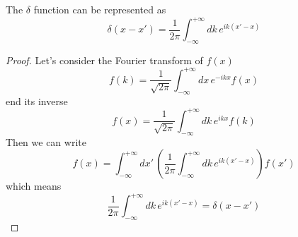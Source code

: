 \documentclass[11pt,fleqn]{book} %
\begin{document}
\begin{theorem}
    The $\delta$ function can be represented as
    \begin{equation*}
        \delta(x-x') = \frac{1}{2\pi}\int_ {-\infty}^{+\infty}\!dk\,e^{ik(x'-x)}
    \end{equation*}
\end{theorem}
\begin{proof}
    Let's consider the Fourier transform of $f(x)$
    \begin{equation*}
        f(k) = \frac{1}{\sqrt{2\pi}}\int_ {-\infty}^{+\infty}\!dx\,e^{-ikx}f(x)
    \end{equation*}
    end its inverse
    \begin{equation*}
        f(x) = \frac{1}{\sqrt{2\pi}}\int_ {-\infty}^{+\infty}\!dk\,e^{ikx}f(k)
    \end{equation*}
    Then we can write
    \begin{equation*}
        f(x) = \int_ {-\infty}^{+\infty}\!dx'\,\left(\frac{1}{2\pi}\int_ {-\infty}^{+\infty}\!dk\,e^{ik(x'-x)}\right)f(x')
    \end{equation*}
    which means
    \begin{equation*}
        \frac{1}{2\pi}\int_ {-\infty}^{+\infty}\!dk\,e^{ik(x'-x)} = \delta(x-x')
    \end{equation*}
\end{proof}
\end{document}
